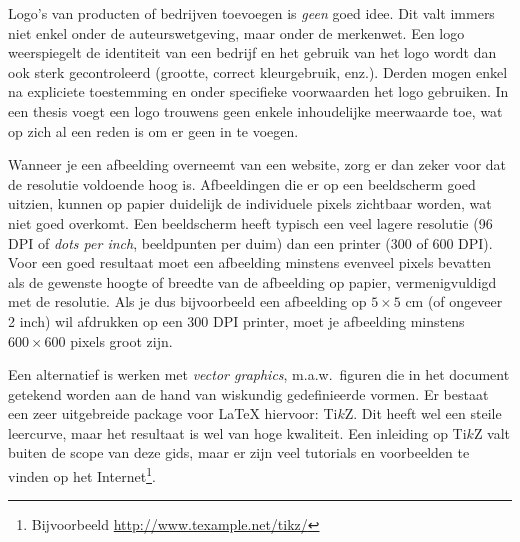 Logo's van producten of bedrijven toevoegen is \emph{geen} goed idee. Dit valt immers niet enkel onder de auteurswetgeving, maar onder de merkenwet. Een logo weerspiegelt de identiteit van een bedrijf en het gebruik van het logo wordt dan ook sterk gecontroleerd (grootte, correct kleurgebruik, enz.). Derden mogen enkel na expliciete toestemming en onder specifieke voorwaarden het logo gebruiken. In een thesis voegt een logo trouwens geen enkele inhoudelijke meerwaarde toe, wat op zich al een reden is om er geen in te voegen.

Wanneer je een afbeelding overneemt van een website, zorg er dan zeker voor dat de resolutie voldoende hoog is. Afbeeldingen die er op een beeldscherm goed uitzien, kunnen op papier duidelijk de individuele pixels zichtbaar worden, wat niet goed overkomt. Een beeldscherm heeft typisch een veel lagere resolutie (96 DPI of \emph{dots per inch}, beeldpunten per duim) dan een printer (300 of 600 DPI). Voor een goed resultaat moet een afbeelding minstens evenveel pixels bevatten als de gewenste hoogte of breedte van de afbeelding op papier, vermenigvuldigd met de resolutie. Als je dus bijvoorbeeld een afbeelding op $5 \times 5$ cm (of ongeveer 2 inch) wil afdrukken op een 300 DPI printer, moet je afbeelding minstens $600 \times 600$ pixels groot zijn.

Een alternatief is werken met \emph{vector graphics}, m.a.w.~figuren die in het document getekend worden aan de hand van wiskundig gedefinieerde vormen. Er bestaat een zeer uitgebreide package voor {\LaTeX} hiervoor: Ti$k$Z. Dit heeft wel een steile leercurve, maar het resultaat is wel van hoge kwaliteit. Een inleiding op Ti$k$Z valt buiten de scope van deze gids, maar er zijn veel tutorials en voorbeelden te vinden op het Internet\footnote{Bijvoorbeeld \url{http://www.texample.net/tikz/}}.


%
